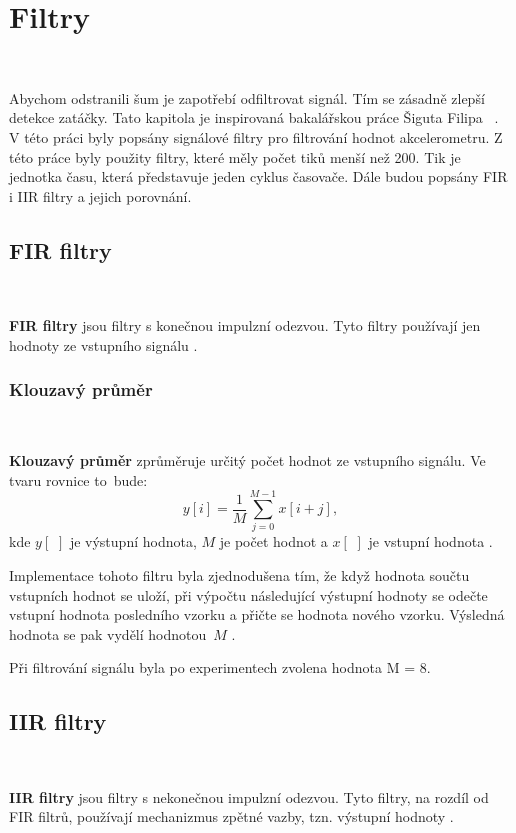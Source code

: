 \chapter{Filtry}
\label{sec:Filters}
\

Abychom odstranili šum je zapotřebí odfiltrovat signál. Tím se zásadně zlepší
detekce zatáčky. Tato kapitola je inspirovaná bakalářskou práce Šiguta Filipa
~\cite{krokomer}.
V této práci byly popsány signálové filtry pro filtrování hodnot akcelerometru. Z této práce byly použity filtry, které měly počet tiků menší než 200. Tik je jednotka času, která představuje jeden cyklus časovače. Dále budou popsány FIR i IIR filtry a jejich porovnání.

\section{FIR filtry}\

\textbf{FIR filtry} jsou filtry s konečnou impulzní odezvou. Tyto filtry používají
jen hodnoty ze vstupního signálu \cite{FIR}.

\subsection{Klouzavý průměr}\

\textbf{Klouzavý průměr} zprůměruje určitý počet hodnot ze vstupního signálu. Ve
tvaru rovnice to~bude:
\begin{equation}
y[i] = \frac{1}{M}\sum_{j = 0}^{M - 1}x[i+j],
\end{equation}
kde $y[\,\,]$ je výstupní hodnota, $M$ je počet hodnot a $x[\,\,]$ je vstupní
hodnota \cite{Filters}.

Implementace tohoto filtru byla zjednodušena tím, že když hodnota součtu vstupních
hodnot se uloží, při výpočtu následující výstupní hodnoty se odečte vstupní hodnota
posledního vzorku a přičte se hodnota nového vzorku. Výsledná hodnota se pak vydělí
hodnotou~$M$ \cite{krokomer}.

Při filtrování signálu byla po experimentech zvolena hodnota M = 8.

\section{IIR filtry}\

\textbf{IIR filtry} jsou filtry s nekonečnou impulzní odezvou. Tyto filtry, na
rozdíl od FIR filtrů, používají mechanizmus zpětné vazby, tzn. výstupní
hodnoty \cite{IIR}.

